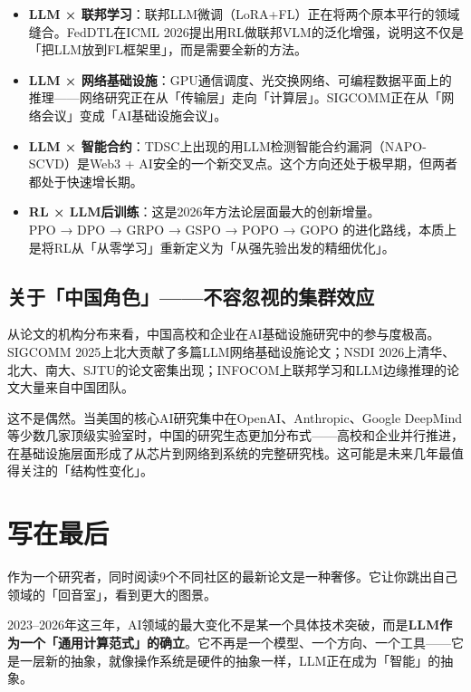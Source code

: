 \documentclass[12pt,a4paper]{ctexart}
\begin{document}
\begin{itemize}[leftmargin=*]
    \item \textbf{LLM × 联邦学习}：联邦LLM微调（LoRA+FL）正在将两个原本平行的领域缝合。FedDTL在ICML 2026提出用RL做联邦VLM的泛化增强，说明这不仅是「把LLM放到FL框架里」，而是需要全新的方法。
    
    \item \textbf{LLM × 网络基础设施}：GPU通信调度、光交换网络、可编程数据平面上的推理——网络研究正在从「传输层」走向「计算层」。SIGCOMM正在从「网络会议」变成「AI基础设施会议」。
    
    \item \textbf{LLM × 智能合约}：TDSC上出现的用LLM检测智能合约漏洞（NAPO-SCVD）是Web3 + AI安全的一个新交叉点。这个方向还处于极早期，但两者都处于快速增长期。
    
    \item \textbf{RL × LLM后训练}：这是2026年方法论层面最大的创新增量。\\
    PPO → DPO → GRPO → GSPO → POPO → GOPO 的进化路线，本质上是将RL从「从零学习」重新定义为「从强先验出发的精细优化」。
\end{itemize}

\subsection{关于「中国角色」——不容忽视的集群效应}

从论文的机构分布来看，中国高校和企业在AI基础设施研究中的参与度极高。SIGCOMM 2025上北大贡献了多篇LLM网络基础设施论文；NSDI 2026上清华、北大、南大、SJTU的论文密集出现；INFOCOM上联邦学习和LLM边缘推理的论文大量来自中国团队。

这不是偶然。当美国的核心AI研究集中在OpenAI、Anthropic、Google DeepMind等少数几家顶级实验室时，中国的研究生态更加分布式——高校和企业并行推进，在基础设施层面形成了从芯片到网络到系统的完整研究栈。这可能是未来几年最值得关注的「结构性变化」。

\section*{写在最后}

作为一个研究者，同时阅读9个不同社区的最新论文是一种奢侈。它让你跳出自己领域的「回音室」，看到更大的图景。

2023--2026年这三年，AI领域的最大变化不是某一个具体技术突破，而是\textbf{LLM作为一个「通用计算范式」的确立}。它不再是一个模型、一个方向、一个工具——它是一层新的抽象，就像操作系统是硬件的抽象一样，LLM正在成为「智能」的抽象。
\end{document}
